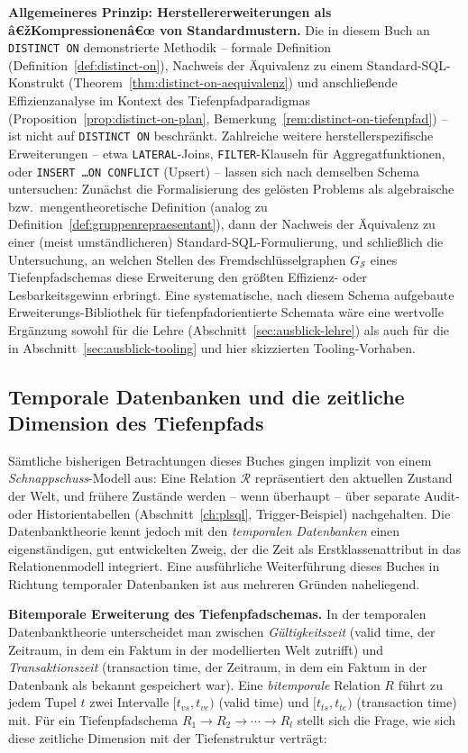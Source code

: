 ﻿\documentclass[a4paper,12pt]{report}
\theoremstyle{definition}
\theoremstyle{remark}
\newcommand{\R}{\mathcal{R}}
\begin{document}
\textbf{Allgemeineres Prinzip: Herstellererweiterungen als
â€žKompressionenâ€œ von Standardmustern.}
Die in diesem Buch an \texttt{DISTINCT ON} demonstrierte Methodik --
formale Definition (Definition~\ref{def:distinct-on}), Nachweis der
Äquivalenz zu einem Standard-SQL-Konstrukt
(Theorem~\ref{thm:distinct-on-aequivalenz}) und anschließende
Effizienzanalyse im Kontext des Tiefenpfadparadigmas
(Proposition~\ref{prop:distinct-on-plan},
Bemerkung~\ref{rem:distinct-on-tiefenpfad}) -- ist nicht auf
\texttt{DISTINCT ON} beschränkt. Zahlreiche weitere
herstellerspezifische Erweiterungen -- etwa \texttt{LATERAL}-Joins,
\texttt{FILTER}-Klauseln für Aggregatfunktionen, oder
\texttt{INSERT \ldots ON CONFLICT} (\glqq Upsert\grqq{}) -- lassen
sich nach demselben Schema untersuchen: Zunächst die Formalisierung
des gelösten Problems als algebraische bzw.\
mengentheoretische Definition (analog zu
Definition~\ref{def:gruppenrepraesentant}), dann der Nachweis der
Äquivalenz zu einer (meist umständlicheren) Standard-SQL-Formulierung,
und schließlich die Untersuchung, an welchen Stellen des
Fremdschlüsselgraphen $G_{\mathcal{S}}$ eines Tiefenpfadschemas diese
Erweiterung den größten Effizienz- oder Lesbarkeitsgewinn erbringt.
Eine systematische, nach diesem Schema aufgebaute
\glqq Erweiterungs-Bibliothek\grqq{} für tiefenpfadorientierte
Schemata wäre eine wertvolle Ergänzung sowohl für die Lehre
(Abschnitt~\ref{sec:ausblick-lehre}) als auch für die in
Abschnitt~\ref{sec:ausblick-tooling} und hier skizzierten
Tooling-Vorhaben.

\subsection{Temporale Datenbanken und die zeitliche Dimension des Tiefenpfads}
\label{sec:ausblick-temporal}

Sämtliche bisherigen Betrachtungen dieses Buches gingen implizit von
einem \emph{Schnappschuss}-Modell aus: Eine Relation $\R$ repräsentiert
den aktuellen Zustand der Welt, und frühere Zustände werden -- wenn
überhaupt -- über separate Audit- oder Historientabellen
(Abschnitt~\ref{ch:plsql}, Trigger-Beispiel) nachgehalten. Die
Datenbanktheorie kennt jedoch mit den \emph{temporalen Datenbanken}
einen eigenständigen, gut entwickelten Zweig, der die Zeit als
Erstklassenattribut in das Relationenmodell integriert. Eine
ausführliche Weiterführung dieses Buches in Richtung temporaler
Datenbanken ist aus mehreren Gründen naheliegend.

\textbf{Bitemporale Erweiterung des Tiefenpfadschemas.} In der
temporalen Datenbanktheorie unterscheidet man zwischen
\emph{Gültigkeitszeit} (valid time, der Zeitraum, in dem ein Faktum in
der modellierten Welt zutrifft) und \emph{Transaktionszeit}
(transaction time, der Zeitraum, in dem ein Faktum in der Datenbank
als bekannt gespeichert war). Eine \emph{bitemporale} Relation $R$
führt zu jedem Tupel $t$ zwei Intervalle
$[t_{vs},t_{ve})$ (valid time) und $[t_{ts},t_{te})$ (transaction
time) mit. Für ein Tiefenpfadschema $R_1\to R_2\to\cdots\to R_l$ stellt
sich die Frage, wie sich diese zeitliche Dimension mit der
Tiefenstruktur verträgt:
\end{document}
